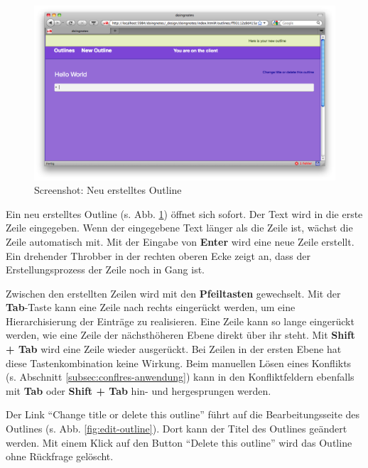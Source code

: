 \medskip
\begin{figure}[ht] 
  \begin{center}
    \includegraphics[width=\textwidth]{grafik/screenshot-new-outline} 
  \end{center}
  \caption{Screenshot: Neu erstelltes Outline}
  \label{fig:new-outline} 
\end{figure}


Ein neu erstelltes Outline (s. Abb. \ref{fig:new-outline}) öffnet sich sofort. Der Text wird in die erste Zeile eingegeben. Wenn der eingegebene Text länger als die Zeile ist, wächst die Zeile automatisch mit. Mit der Eingabe von \textbf{Enter} wird eine neue Zeile erstellt. Ein drehender Throbber in der rechten oberen Ecke zeigt an, dass der Erstellungsprozess der Zeile noch in Gang ist. 

Zwischen den erstellten Zeilen wird mit den \textbf{Pfeiltasten} gewechselt. Mit der \textbf{Tab}-Taste kann eine Zeile nach rechts eingerückt werden, um eine Hierarchisierung der Einträge zu realisieren. Eine Zeile kann so lange eingerückt werden, wie eine Zeile der nächsthöheren Ebene direkt über ihr steht. Mit \textbf{Shift + Tab} wird eine Zeile wieder ausgerückt. Bei Zeilen in der ersten Ebene hat diese Tastenkombination keine Wirkung. Beim manuellen Lösen eines Konflikts (s. Abschnitt \ref{subsec:conflres-anwendung}) kann in den Konfliktfeldern ebenfalls mit \textbf{Tab} oder \textbf{Shift + Tab} hin- und hergesprungen werden. 


Der Link \enquote{Change title or delete this outline} führt auf die Bearbeitungsseite des Outlines (s. Abb. \ref{fig:edit-outline}). Dort kann der Titel des Outlines geändert werden. Mit einem Klick auf den Button \enquote{Delete this outline} wird das Outline ohne Rückfrage gelöscht.

